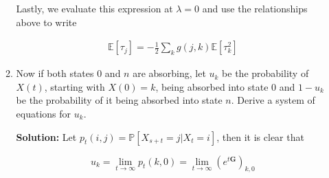 \documentclass[12pt, a4paper]{article}
\begin{document}
\begin{enumerate}
\begin{enumerate}
        Lastly, we evaluate this expression at $\lambda=0$ and use the relationships above to write

        \begin{align*}
            \mathbb E[\tau_j] = -\frac{1}{2} \sum_k g(j,k)\mathbb E[\tau_k^2] 
        \end{align*}

        \item Now if both states $0$ and $n$ are absorbing, let $u_k$ be the probability of $X(t)$, starting with $X(0)=k$, being absorbed into state $0$ and $1-u_k$ be the probability of it being absorbed into state $n$. Derive a system of equations for $u_k$.

        \textbf{Solution:} Let $p_t(i,j) = \mathbb P [X_{s+t}=j|X_t=i]$, then it is clear that

        $$u_k = \lim_{t \rightarrow \infty} p_t(k,0) = \lim_{t\rightarrow \infty} \left(e^{t \mathbf G} \right)_{k,0}$$
    \end{enumerate}

\end{enumerate}
\end{document}
